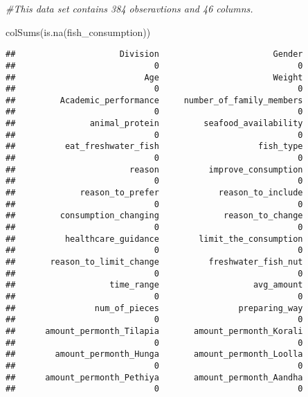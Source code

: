 \documentclass[
]{article}
\newenvironment{Shaded}{\begin{snugshade}}{\end{snugshade}}
\newcommand{\CommentTok}[1]{\textcolor[rgb]{0.56,0.35,0.01}{\textit{#1}}}
\newcommand{\FunctionTok}[1]{\textcolor[rgb]{0.00,0.00,0.00}{#1}}
\newcommand{\NormalTok}[1]{#1}
\begin{document}
\begin{Shaded}
\begin{Highlighting}[]
\CommentTok{\#This data set contains 384 obseravtions and 46 columns.}
\end{Highlighting}
\end{Shaded}

\begin{Shaded}
\begin{Highlighting}[]
\FunctionTok{colSums}\NormalTok{(}\FunctionTok{is.na}\NormalTok{(fish\_consumption))}
\end{Highlighting}
\end{Shaded}

\begin{verbatim}
##                     Division                       Gender 
##                            0                            0 
##                          Age                       Weight 
##                            0                            0 
##         Academic_performance     number_of_family_members 
##                            0                            0 
##               animal_protein         seafood_availability 
##                            0                            0 
##          eat_freshwater_fish                    fish_type 
##                            0                            0 
##                       reason          improve_consumption 
##                            0                            0 
##             reason_to_prefer            reason_to_include 
##                            0                            0 
##         consumption_changing             reason_to_change 
##                            0                            0 
##          healthcare_guidance        limit_the_consumption 
##                            0                            0 
##       reason_to_limit_change          freshwater_fish_nut 
##                            0                            0 
##                   time_range                   avg_amount 
##                            0                            0 
##                num_of_pieces                preparing_way 
##                            0                            0 
##      amount_permonth_Tilapia       amount_permonth_Korali 
##                            0                            0 
##        amount_permonth_Hunga       amount_permonth_Loolla 
##                            0                            0 
##      amount_permonth_Pethiya       amount_permonth_Aandha 
##                            0                            0 

\end{verbatim}
\end{document}
